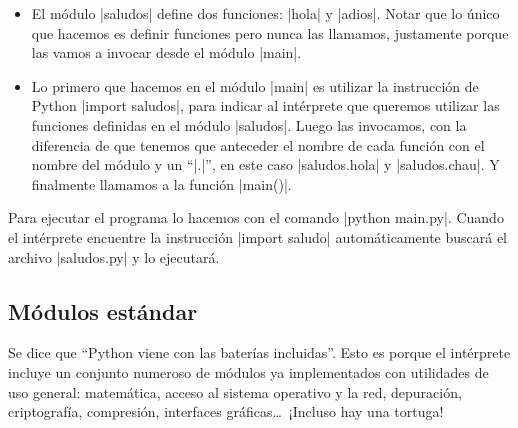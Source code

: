 \begin{itemize}
\item El módulo |saludos| define dos funciones: |hola| y |adios|. Notar que lo
    único que hacemos es definir funciones pero nunca las llamamos, justamente
    porque las vamos a invocar desde el módulo |main|.
\item Lo primero que hacemos en el módulo |main| es utilizar la instrucción de
    Python |import saludos|, para indicar al intérprete que queremos utilizar
    las funciones definidas en el módulo |saludos|. Luego las invocamos, con la
    diferencia de que tenemos que anteceder el nombre de cada función con el
    nombre del módulo y un ``|.|'', en este caso |saludos.hola| y |saludos.chau|.
    Y finalmente llamamos a la función |main()|.
\end{itemize}

Para ejecutar el programa lo hacemos con el comando |python main.py|. Cuando el
intérprete encuentre la instrucción |import saludo| automáticamente buscará el
archivo |saludos.py| y lo ejecutará.

\subsection{Módulos estándar}

Se dice que ``Python viene con las baterías incluidas''. Esto es porque el
intérprete incluye un conjunto numeroso de módulos ya implementados con
utilidades de uso general: matemática, acceso al
sistema operativo y la red, depuración, criptografía, compresión, interfaces
gráficas\ldots\ ¡Incluso hay una tortuga!

